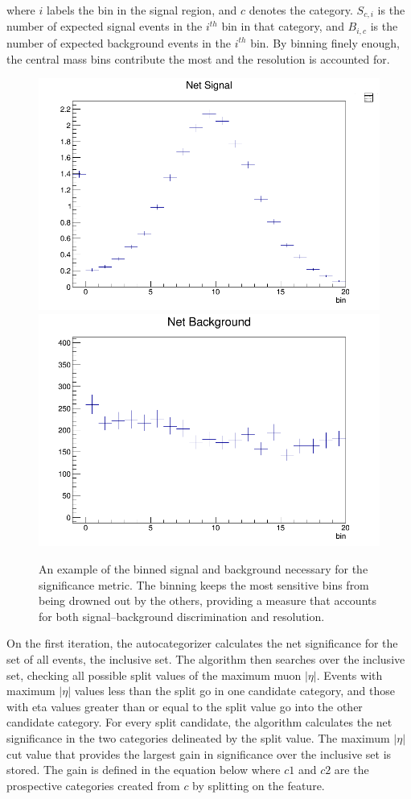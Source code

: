 where $i$ labels the bin in the signal region, and $c$ denotes the category. $S_{c,i}$ is the number of expected signal
events in the $i^{th}$ bin in that category, and $B_{i,c}$ is the number of expected background events in the $i^{th}$ bin.
By binning finely enough, the central mass bins contribute the most and the resolution is accounted for.

\begin{figure}[hbp]
  \centering
  \includegraphics[width=0.49\linewidth]{figures/bdt_cats/binning_signal_example.png}
  \includegraphics[width=0.49\linewidth]{figures/bdt_cats/binning_bg_example.png}
  \caption
  {An example of the binned signal and background necessary for the significance metric. The binning keeps the most sensitive bins
   from being drowned out by the others, providing a measure that accounts for both signal--background discrimination and resolution.}
  \label{fig:binning_example}
\end{figure}

On the first iteration, the autocategorizer calculates the net significance for the set of all events, the inclusive set.
The algorithm then searches over the inclusive set, checking all possible split values of the maximum muon $|\eta|$. Events
with maximum $|\eta|$ values less than the split go in one candidate category, and those with eta values greater than or equal
to the split value go into the other candidate category. For every split candidate, the algorithm calculates the net significance
in the two categories delineated by the split value. The maximum $|\eta|$ cut value that provides the largest gain in significance
over the inclusive set is stored. The gain is defined in the equation below where $c1$ and $c2$ are the prospective categories
created from $c$ by splitting on the feature.

